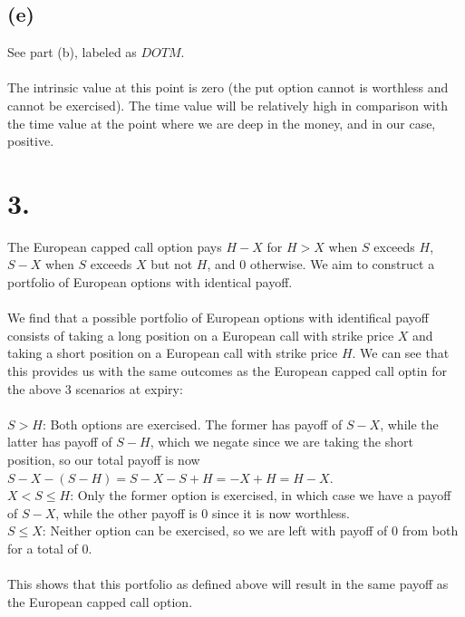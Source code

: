 \documentclass{article}
\begin{document}
{\subsection*{(e)}

See part (b), labeled as $DOTM$. \\ \\
The intrinsic value at this point is zero (the put option cannot is worthless and cannot be exercised). 
The time value will be relatively high in comparison with the time value at the point where we are deep in the money, and in our case, positive. 

}

\section*{3.}
{\Large 

The European capped call option pays $H - X$ for $H > X$ when $S$ exceeds $H$, $S - X$ when $S$ exceeds $X$ but not $H$, and 0 otherwise. We aim to construct a portfolio of European options with identical payoff. \\ \\
We find that a possible portfolio of European options with identifical payoff consists of taking a long position on a European call with strike price $X$ and taking a short position on a European call with strike price $H$. We can see that this provides us with the same outcomes as the European capped call optin for the above 3 scenarios at expiry: \\ \\ 
$S > H$: Both options are exercised. The former has payoff of $S - X$, while the latter has payoff of $S - H$, which we negate since we are taking the short position, so our total payoff is now $S - X - (S - H) = S - X - S + H = -X + H = H - X$. \\
$X < S \leq H$: Only the former option is exercised, in which case we have a payoff of $S - X$, while the other payoff is 0 since it is now worthless. \\
$S \leq X$: Neither option can be exercised, so we are left with payoff of 0 from both for a total of 0. \\ \\
This shows that this portfolio as defined above will result in the same payoff as the European capped call option.

}
\end{document}

